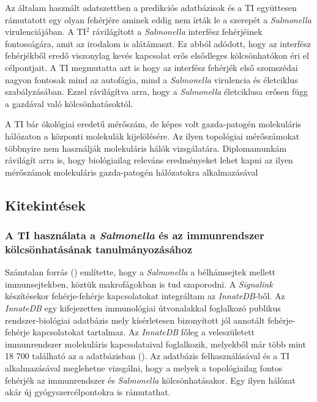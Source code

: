 \documentclass[a4paper,12pt]{article}
\begin{document}
		Az általam használt adatszettben a predikciós adatbázisok és a TI együttesen rámutatott egy olyan fehérjére aminek eddig nem írták le a szerepét a \textit{Salmonella} virulenciájában. A TI$^2$ rávilágított a \textit{Salmonella} interfész fehérjéinek fontosságára, amit az irodalom is alátámaszt. Ez abból adódott, hogy az interfész fehérjékből eredő viszonylag kevés kapcsolat erős elsődleges kölcsönhatókon éri el célpontjait. A TI megmutatta azt is hogy az interfész fehérjék első szomszédai nagyon fontosak mind az autofágia, mind a \textit{Salmonella} virulencia és életciklus szabályzásában. Ezzel rávilágítva arra, hogy a \textit{Salmonella} életciklusa erősen függ a gazdával való kölcsönhatásoktól.
		
		A TI bár ökológiai eredetű mérőszám, de képes volt gazda-patogén molekuláris hálózaton a központi molekulák kijelölésére. Az ilyen topológiai mérőszámokat többnyire nem használják molekuláris hálók vizsgálatára. Diplomamunkám rávilágít arra is, hogy biológiailag releváns eredményeket lehet kapni az ilyen mérőszámok molekuláris gazda-patogén hálózatokra alkalmazásával
		
		\subsection{Kitekintések}
		\subsubsection{A TI használata a \textit{Salmonella} és az immunrendszer kölcsönhatásának tanulmányozásához}
		Számtalan forrás \cite{salmonella_and_host_cell_nature} \cite{salmonella_autophagy_nature_old} (\cite{hilD}) említette, hogy a \textit{Salmonella} a bélhámsejtek mellett immunsejtekben, köztük makrofágokban is tud szaporodni. A \textit{Signalink} készítésekor fehérje-fehérje kapcsolatokat integráltam az \textit{InnateDB}-ből. Az \textit{InnateDB} egy kifejezetten immunológiai útvonalakkal foglalkozó publikus rendszer-biológiai adatbázis mely kísérletesen bizonyított jól annotált fehérje-fehérje kapcsolatokat tartalmaz. Az \textit{InnateDB} főleg a veleszületett immunrendszer molekuláris kapcsolataival foglalkozik, melyekből már több mint 18 700 található az a adatbázisban (\cite{innatedb}). Az adatbázis felhasználásával és a TI alkalmazásával meglehetne vizsgálni, hogy a melyek a topológiailag fontos fehérjék az immunrendszer és \textit{Salmonella} kölcsönhatásakor. Egy ilyen hálózat akár új gyógyszercélpontokra is rámutathat.	 
		
\end{document}

